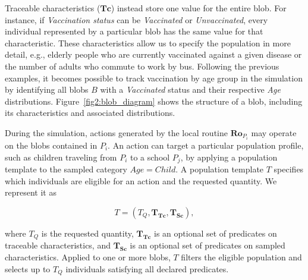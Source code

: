 Traceable characteristics ($\bm{Tc}$) instead store one value for the entire blob. For instance, if \textit{Vaccination status} can be \textit{Vaccinated} or \textit{Unvaccinated}, every individual represented by a particular blob has the same value for that characteristic. 
These characteristics allow us to specify the population in more detail, e.g., elderly people who are currently vaccinated against a given disease or the number of adults who commute to work by bus. Following the previous examples, it becomes possible to track vaccination by age group in the simulation by identifying all blobs $B$ with a \textit{Vaccinated} status and their respective \textit{Age} distributions. Figure~\ref{fig2:blob_diagram} shows the structure of a blob, %
including its characteristics and associated distributions.

During the simulation, actions generated by the local routine $\bm{Ro}_{P_i}$ may operate on the blobs contained in $P_i$. An action can target a particular population profile, such as children traveling from $P_i$ to a school $P_j$, by applying a population template to the sampled category $Age=Child$.
A population template $T$ specifies which individuals are eligible for an action and the requested quantity. We represent it as

\begin{equation}
T=(T_Q,\bm{T_{Tc}},\bm{T_{Sc}}),
\label{eq:population_template_definition}
\end{equation}

where $T_Q$ is the requested quantity, $\bm{T_{Tc}}$ is an optional set of predicates on traceable characteristics, and $\bm{T_{Sc}}$ is an optional set of predicates on sampled characteristics. Applied to one or more blobs, $T$ filters the eligible population and selects up to $T_Q$ individuals satisfying all declared predicates.


